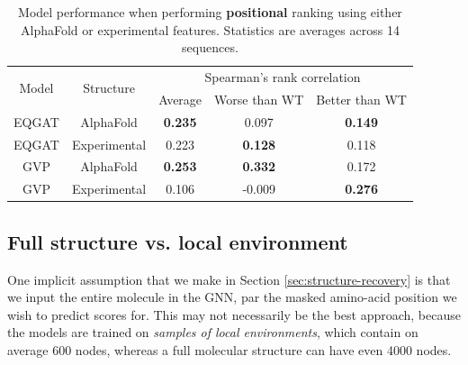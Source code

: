 \documentclass[12pt,a4paper]{report}
\begin{document}
\begin{table}[!h]
\caption{Model performance when performing \textbf{positional} ranking using either AlphaFold or experimental features. Statistics are averages across 14 sequences.}
\label{ablation-alphafold-positional}
\vskip 0.15in
\begin{center}
\begin{small}
\begin{sc}

\begin{tabular}{@{}ccccc@{}}
\toprule
\multirow{2}{*}{Model} & \multirow{2}{*}{Structure} & \multicolumn{3}{c}{Spearman's rank correlation}  \\ \cmidrule(l){3-5} 
                       &                            & Average        & Worse than WT  & Better than WT \\ \midrule
EQGAT                  & AlphaFold                  & \textbf{0.235} & 0.097          & \textbf{0.149} \\
EQGAT                  & Experimental               & 0.223          & \textbf{0.128} & 0.118          \\ \midrule
GVP                    & AlphaFold                  & \textbf{0.253} & \textbf{0.332} & 0.172          \\
GVP                    & Experimental               & 0.106          & -0.009         & \textbf{0.276} \\ \bottomrule
\end{tabular}

\end{sc}
\end{small}
\end{center}
\vskip -0.1in
\end{table}

\subsection{Full structure vs. local environment}
\label{appendix-full-vs-local}
One implicit assumption that we make in Section \ref{sec:structure-recovery} is that we input the entire molecule in the GNN, par the masked amino-acid position we wish to predict scores for. This may not necessarily be the best approach, because the models are trained on \textit{samples of local environments}, which contain on average 600 nodes, whereas a full molecular structure can have even 4000 nodes. 
\end{document}
